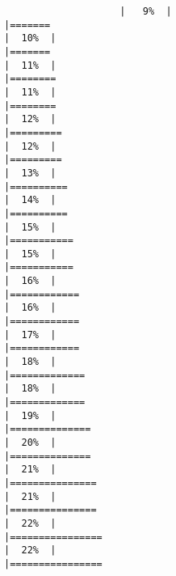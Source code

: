 \documentclass[
]{article}
\begin{document}
\begin{verbatim}
                    |   9%  |                                                                              |=======                                                               |  10%  |                                                                              |=======                                                               |  11%  |                                                                              |========                                                              |  11%  |                                                                              |========                                                              |  12%  |                                                                              |=========                                                             |  12%  |                                                                              |=========                                                             |  13%  |                                                                              |==========                                                            |  14%  |                                                                              |==========                                                            |  15%  |                                                                              |===========                                                           |  15%  |                                                                              |===========                                                           |  16%  |                                                                              |============                                                          |  16%  |                                                                              |============                                                          |  17%  |                                                                              |============                                                          |  18%  |                                                                              |=============                                                         |  18%  |                                                                              |=============                                                         |  19%  |                                                                              |==============                                                        |  20%  |                                                                              |==============                                                        |  21%  |                                                                              |===============                                                       |  21%  |                                                                              |===============                                                       |  22%  |                                                                              |================                                                      |  22%  |                                                                              |================                                   
\end{verbatim}
\end{document}
